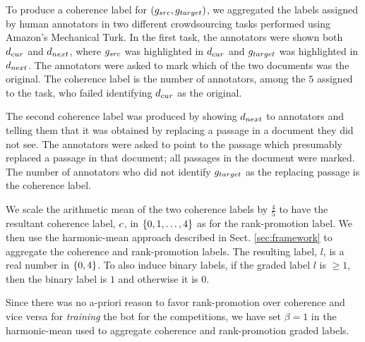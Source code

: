 To produce a coherence label for
$(g_{src},g_{target})$, we aggregated the labels assigned by human
annotators in two different crowdsourcing tasks performed using
Amazon's Mechanical Turk.
In the first
task,
the annotators were shown both $d_{cur}$ and $d_{next}$, where
$g_{src}$ was highlighted in $d_{cur}$ and $g_{target}$ was highlighted
in $d_{next}$.
The annotators were asked to mark which of the two documents was the
original. The coherence label is the number of annotators,
among the $5$ assigned to the task, who failed identifying $d_{cur}$
as the original.

The
second coherence label was produced by showing $d_{next}$ to annotators
and telling them that it was obtained by replacing a passage in a document they did not see. The annotators were asked to point to the passage which
presumably replaced a passage in that document; all passages in the document were marked. The number of annotators who did not
identify $g_{target}$ as the replacing passage is the coherence label.

We scale the arithmetic mean of the two coherence labels by $\frac{4}{5}$ to have
the resultant coherence label, $c$,
in $\{0,1,\ldots,4\}$ as for the rank-promotion
label. We then use the harmonic-mean approach described in Sect. \ref{sec:framework} to aggregate the coherence and rank-promotion labels. The resulting label, $l$, is a real number in $\{0,4\}$. To also induce binary labels, if the graded label $l$ is $ \ge 1$, then the binary label is $1$ and otherwise it is $0$.

Since there was no a-priori reason to favor rank-promotion
over coherence and vice versa for {\em training} the bot for the
competitions, we have set $\beta=1$ in the harmonic-mean used to
aggregate coherence and rank-promotion graded labels. 

